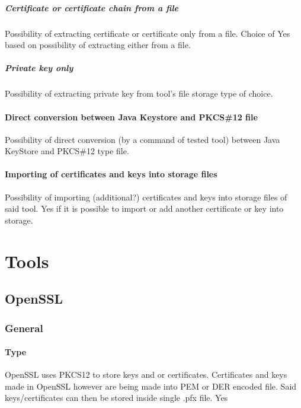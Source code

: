 \documentclass[10pt, a4paper]{report}
\begin{document}
\subsubsection{Certificate or certificate chain from a file}
Possibility of extracting certificate or certificate only from a file. Choice of Yes based on possibility of extracting either from a file.

\subsubsection{Private key only}
Possibility of extracting private key from tool's file storage type of choice.

\subsection{Direct conversion between Java Keystore and PKCS\#12 file}
Possibility of direct conversion (by a command of tested tool) between Java KeyStore and PKCS\#12 type file.

\subsection{Importing of certificates and keys into storage files}
Possibility of importing (additional?) certificates and keys into storage files of said tool. Yes if it is possible to import or add another certificate or key into storage.


\newpage
\part{Tools}

\chapter{OpenSSL}

\section{General}

  \subsection{Type}
  OpenSSL uses PKCS12 to store keys and or certificates. Certificates and keys  made in OpenSSL however are being made into PEM or DER encoded file. Said keys/certificates can then be stored inside single .pfx file. 
  Yes             
\end{document}
